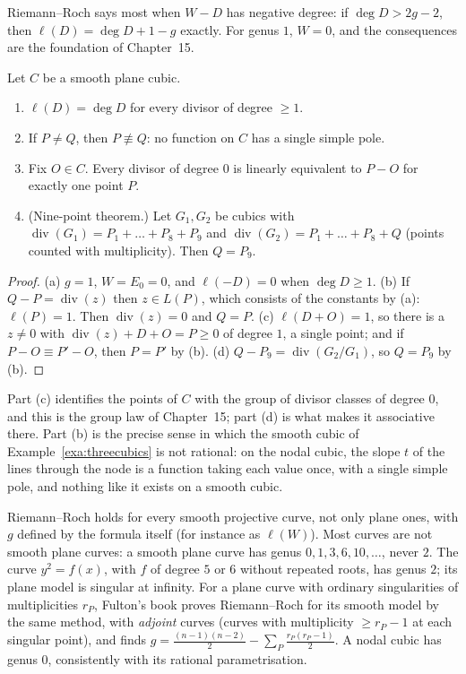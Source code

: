 Riemann--Roch says most when $W-D$ has negative degree: if $\deg D>2g-2$, then $\ell(D)=\deg D+1-g$ exactly. For genus $1$, $W=0$, and the
consequences are the foundation of Chapter~15.

\begin{corollary}\label{cor:genus1}
Let $C$ be a smooth plane cubic.
\begin{enumerate}[label=(\alph*)]
\item $\ell(D)=\deg D$ for every divisor of degree $\ge1$.
\item If $P\ne Q$, then $P\not\equiv Q$: no function on $C$ has a single simple pole.
\item Fix $O\in C$. Every divisor of degree $0$ is linearly equivalent to $P-O$ for exactly one point $P$.
\item (Nine-point theorem.) Let $G_1,G_2$ be cubics with $\operatorname{div}(G_1)=P_1+\dots+P_8+P_9$ and $\operatorname{div}(G_2)=P_1+\dots+P_8+Q$ (points
counted with multiplicity). Then $Q=P_9$.
\end{enumerate}
\end{corollary}
\begin{proof}
(a) $g=1$, $W=E_0=0$, and $\ell(-D)=0$ when $\deg D\ge1$. (b) If $Q-P=\operatorname{div}(z)$ then $z\in L(P)$, which consists of the constants by (a):
$\ell(P)=1$. Then $\operatorname{div}(z)=0$ and $Q=P$. (c) $\ell(D+O)=1$, so there is a
$z\ne0$ with $\operatorname{div}(z)+D+O=P\ge0$ of degree $1$, a single point; and if $P-O\equiv P'-O$, then $P=P'$ by (b). (d) $Q-P_9=\operatorname{div}(G_2/G_1)$, so
$Q=P_9$ by (b).
\end{proof}

Part (c) identifies the points of $C$ with the group of divisor classes of degree $0$, and this is the group law of Chapter~15; part (d) is what
makes it associative there. Part (b) is the precise sense in which the smooth cubic of Example~\ref{exa:threecubics} is not rational: on the nodal cubic, the slope $t$ of the lines
through the node is a function taking each value once, with a single simple pole, and nothing like it exists on a smooth cubic.

\begin{remark}
Riemann--Roch holds for every smooth projective curve, not only plane ones, with $g$ defined by the formula itself (for instance as $\ell(W)$). Most curves
are not smooth plane curves: a smooth plane curve has genus $0,1,3,6,10,\dots$, never $2$. The curve $y^2=f(x)$, with $f$ of degree $5$ or $6$ without
repeated roots, has genus $2$; its plane model is singular at infinity. For a plane curve with ordinary singularities of multiplicities $r_P$, Fulton's
book proves Riemann--Roch for its smooth model by the same method, with \emph{adjoint} curves (curves with multiplicity $\ge r_P-1$ at each singular point),
and finds $g=\frac{(n-1)(n-2)}2-\sum_P\frac{r_P(r_P-1)}2$. A nodal cubic has genus $0$, consistently with its rational parametrisation.
\end{remark}

